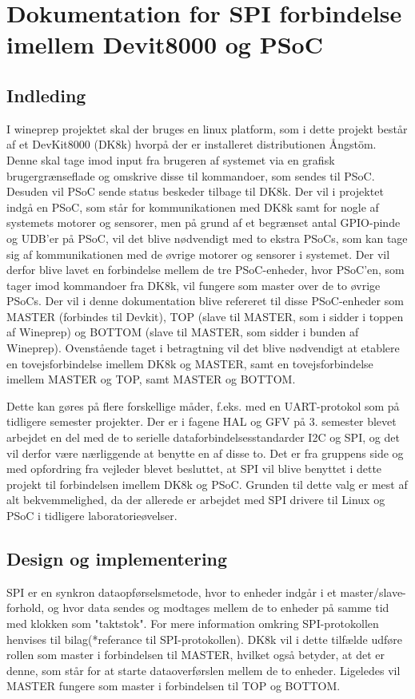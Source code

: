 ﻿\chapter{Dokumentation for SPI forbindelse imellem Devit8000 og PSoC}

\section{Indleding}
I wineprep projektet skal der bruges en linux platform, som i dette projekt består af et DevKit8000 (DK8k) hvorpå der er installeret distributionen Ångstöm. 
Denne skal tage imod input fra brugeren af systemet via en grafisk brugergrænseflade og omskrive disse til kommandoer, som sendes til PSoC. Desuden
vil PSoC sende status beskeder tilbage til DK8k.
Der vil i projektet indgå en PSoC, som står for kommunikationen med DK8k samt for nogle af systemets motorer og sensorer,
men på grund af et begrænset antal GPIO-pinde og UDB'er på PSoC, vil det blive nødvendigt med to ekstra PSoCs, som kan tage sig af kommunikationen med de 
øvrige motorer og sensorer i systemet. Der vil derfor blive lavet en forbindelse mellem de tre PSoC-enheder, hvor PSoC'en, som tager imod kommandoer fra
DK8k, vil fungere som master over de to øvrige PSoCs. Der vil i denne dokumentation blive refereret til disse PSoC-enheder som MASTER
(forbindes til Devkit), TOP (slave til MASTER, som i sidder i toppen af Wineprep) og BOTTOM (slave til MASTER, som sidder i bunden af
Wineprep).
Ovenstående taget i betragtning vil det blive nødvendigt at etablere en tovejsforbindelse imellem DK8k og MASTER, samt en tovejsforbindelse imellem 
MASTER og TOP, samt MASTER og BOTTOM. 

Dette kan gøres på flere forskellige måder, f.eks. med en UART-protokol som på tidligere semester projekter. Der er i fagene HAL og GFV på 3. semester 
blevet arbejdet en del med de to serielle dataforbindelsesstandarder I2C og SPI, og det vil derfor være nærliggende at benytte en af disse to. 
Det er fra gruppens side og med opfordring fra vejleder blevet besluttet, at SPI vil blive benyttet i dette projekt til forbindelsen imellem DK8k og 
PSoC. Grunden til dette valg er mest af alt bekvemmelighed, da der allerede er arbejdet med SPI drivere til Linux og PSoC i tidligere laboratorieøvelser.   

\section{Design og implementering}
SPI er en synkron dataopførselsmetode, hvor to enheder indgår i et master/slave-forhold, og hvor data sendes og modtages mellem de to enheder på
samme tid med klokken som "taktstok". For mere information omkring SPI-protokollen henvises til bilag(*referance til SPI-protokollen).
DK8k vil i dette tilfælde udføre rollen som master i forbindelsen til MASTER, hvilket også betyder, at det er denne, som står for at starte 
dataoverførslen mellem de to enheder. Ligeledes vil MASTER fungere som master i forbindelsen til TOP og BOTTOM.

